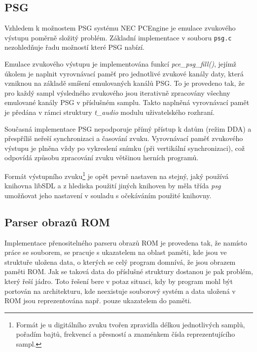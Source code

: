 %
%

\subsection{PSG}

Vzhledem k možnostem PSG systému NEC PCEngine je emulace zvukového výstupu
poměrně složitý problém. Základní implementace v souboru {\tt psg.c}
nezohledňuje řadu možností které PSG nabízí.

Emulace zvukového výstupu je implementována funkcí {\it pce\_psg\_fill()},
jejímž úkolem je naplnit vyrovnávací paměť pro jednotlivé zvukové kanály daty,
která vzniknou na základě smíšení emulovaných kanálů PSG. To je provedeno tak,
že pro každý sampl výsledného zvukového jsou iterativně zpracovány všechny
emulované kanály PSG v příslušném samplu. Takto naplněná vyrovnávací pamět je
předána v rámci struktury {\it t\_audio} modulu uživatelského rozhraní.

Současná implementace PSG nepodporuje přímý přístup k datům (režim DDA) a
přespříliš neřeší synchronizaci a časování zvuku. Vyrovnávací paměť zvukového
výstupu je plněna vždy po vykreslení snímku (při vertikální synchronizaci),
což odpovídá způsobu zpracování zvuku většinou herních programů.

Formát výstupního zvuku\footnote{Formát je u digitálního zvuku tvořen zpravidla
délkou jednotlivých samplů, pořadím bajtů, frekvencí a přesností a znaménkem
čísla reprezentujícího sampl.} je opět pevně nastaven na stejný, jaký používá
knihovna libSDL a z hlediska použití jiných knihoven by měla třída {\it
psg} umožňovat jeho nastavení v souladu s očekáváním použité knihovny.

%
%

\subsection{Parser obrazů ROM}

Implementace přenositelného parseru obrazů ROM je provedena tak, že namísto
práce se souborem, se pracuje s ukazatelem na oblast paměti, kde jsou ve
struktuře uložena data, o kterých se celý program domnívá, že jsou obrazem
paměti ROM. Jak se taková data do příslušné struktury dostanou je pak problém,
který řeší jádro. Toto řešení bere v potaz situaci, kdy by program mohl být
portován na architekturu, kde neexistuje souborový systém a data uložená v ROM
jsou reprezentována např. pouze ukazatelem do paměti.

